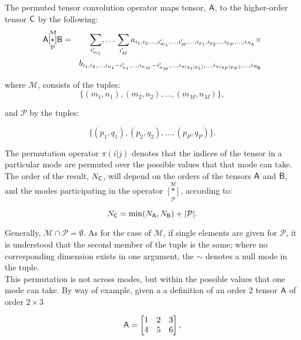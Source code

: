 The permuted tensor convolution operator maps tensor, $\mathsf{A}$, to the higher-order tensor $\mathsf{C}$ by the following:
\begin{eqnarray}
\mathsf{A} \underset{\mathcal{P}}{\overset{\mathcal{M}}{[ \ast ]}} {\mathsf{B}} &=& \sum_{i'_{m_1}},\ldots\,\sum_{i_{M}'}   a_{i_1,i_2,...,i_{m_1}',...,i_{M}',...,i_{p_1},i_{p_2},...i_{p_P},...,i_{N_{\mathsf{A}}}} \times \nonumber \\
& &b_{i_1,i_2,...,i_{n_1}-i_{n_1}',...,i_{n_M}-i_{n_M}',...,i_{\pi(q_1|p_1)},...,i_{\pi(q_P|p_P)},...,i_{N_{\mathsf{B}}}}
\label{eq:t2}
\end{eqnarray}

where $\mathcal{M}$, consists of the tuples:
\begin{equation}
\lbrace(m_1,n_1),(m_2,n_2),...,(m_{M},n_{M})\rbrace,
\end{equation}

and $\mathcal{P}$ by the tuples:

\begin{equation}
\lbrace(p_1,q_1),(p_2,q_2),...,(p_{P},q_{P})\rbrace.
\end{equation}

The permutation operator $\pi(i|j)$ denotes that the indices of the tensor in a particular mode are permuted over the possible values that that mode can take.  The order of the result, $N_{\mathsf{C}}$, will depend on the orders of the tensors $\mathsf{A}$ and $\mathsf{B}$, and the modes participating in the operator $\underset{\mathcal{P}}{\overset{\mathcal{M}}{[ \ast ]}}$, according to:

\begin{equation}
N_{\mathsf{C}} = \min(N_{\mathsf{A}},N_{\mathsf{B}}) +  |\mathcal{P}|.
\end{equation}

Generally, $\mathcal{M}\cap\mathcal{P}=\emptyset$.  As for the case of $\mathcal{M}$, if single elements are given for $\mathcal{P}$, it is understood that the second member of the tuple is the same; where no corresponding dimension exists in one argument, the $\sim$ denotes a null mode in the tuple.\\

This permutation is not across modes, but within the possible values that one mode can take.  By way of example, given a a definition of an order 2 tensor $\mathsf{A}$ of order $2\times 3$ 

\begin{equation}
\mathsf{A} = \begin{bmatrix}
1 & 2 & 3 \\
4 & 5 & 6 \\
\end{bmatrix},
\end{equation}

